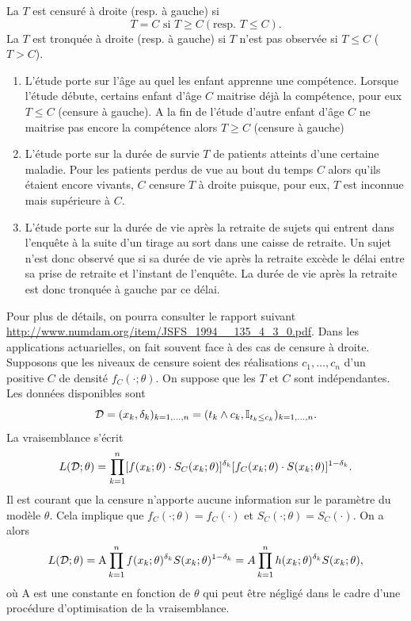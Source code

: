 \begin{definition}\label{def:censure_tronquature}
La \va $T$ est censuré à droite (resp. à gauche) si 
$$
T = C \text{ si }T\geq C (\text{resp. } T\leq C).
$$
La \va $T$ est tronquée à droite (resp. à gauche) si $T$ n'est pas observée si
$T\leq C$ ( $T>C$).
\end{definition}
\begin{ex}
\begin{enumerate}
\item L'étude porte sur l'âge au quel les enfant apprenne une compétence. Lorsque l'étude débute, certains enfant d'âge $C$ maitrise déjà la compétence, pour eux $T\leq C$ (censure à gauche). A la fin de l'étude d'autre enfant d'âge $C$ ne maitrise pas encore la compétence alors $T\geq C$ (censure à gauche)

\item L'étude porte sur la durée de survie $T$ de patients atteints d'une certaine maladie. Pour les patients perdus de vue
au bout du temps $C$ alors qu'ils étaient encore vivants, $C$ censure $T$ à droite puisque, pour eux, $T$ est inconnue mais supérieure à $C$.
\item L'étude porte sur la durée de vie après la retraite de sujets qui entrent dans l'enquête à la suite d'un tirage au sort dans une caisse de retraite. Un sujet n'est donc observé que si sa durée de vie après la retraite excède le délai entre sa prise de retraite et l'instant de l'enquête. La durée de vie après la retraite est donc tronquée à gauche par ce délai.
\end{enumerate}
\end{ex}
Pour plus de détails, on pourra consulter le rapport suivant \url{http://www.numdam.org/item/JSFS_1994__135_4_3_0.pdf}. Dans les applications actuarielles, on fait souvent face à des cas de censure à droite. Supposons que les niveaux de censure soient des réalisations \iid $c_1,\ldots, c_n$ d'un \va positive $C$ de densité $f_C(\cdot;\theta)$. On suppose que les \va $T$ et $C$ sont indépendantes. Les données disponibles sont
$$ 
\mathcal{D} = (x_k,\delta_k)_{k=1,\ldots, n} = (t_k\land c_k,\mathbb{I}_{t_k\leq c_k})_{k=1,\ldots, n}.
$$
La vraisemblance s'écrit
$$
L(\mathcal{D};\theta) = \prod_{k=1}^n[f(x_k;\theta)\cdot S_C(x_k;\theta)]^{\delta_k}[f_C(x_k;\theta)\cdot S(x_k;\theta)]^{1-\delta_k}.
$$
Il est courant que la censure n'apporte aucune information sur le paramètre du modèle $\theta$. Cela implique que $f_C(\cdot;\theta) = f_C(\cdot)$ et $S_C(\cdot;\theta) = S_C(\cdot)$. On a alors
$$
L(\mathcal{D};\theta) = \text{A}\prod_{k=1}^nf(x_k;\theta)^{\delta_k}S(x_k;\theta)^{1-\delta_k} =  A\prod_{k=1}^nh(x_k;\theta)^{\delta_k}S(x_k;\theta),
$$
où $\text{A}$ est une constante en fonction de $\theta$ qui peut être négligé dans le cadre d'une procédure d'optimisation de la vraisemblance. 
